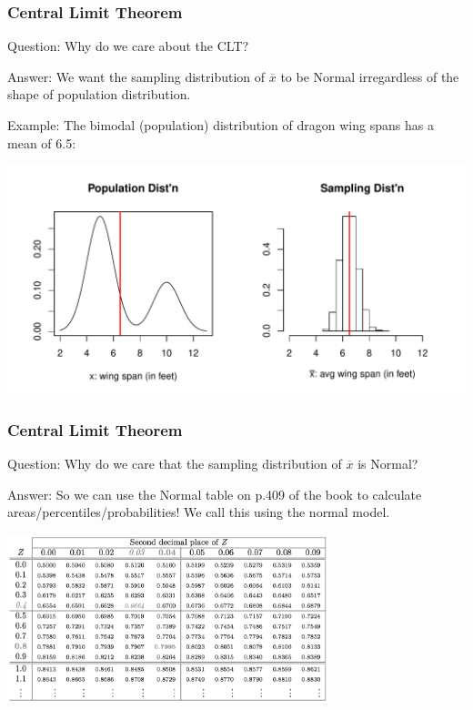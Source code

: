\documentclass[handout]{beamer}
\newcommand{\blue}[1]{\textcolor{blue2}{#1}}
\newcommand{\xbar}{\overline{x}}
\begin{document}
\begin{frame}
\frametitle{Central Limit Theorem}
\blue{Question}:  Why do we care about the CLT?

\vspace{0.25cm}

\blue{Answer}:  We want the sampling distribution of $\xbar$ to be Normal \blue{irregardless} of the shape of population distribution.

\vspace{0.25cm}

\blue{Example}:  The bimodal (population) distribution of dragon wing spans has a mean of 6.5:

\begin{center}
\includegraphics[width=\textwidth]{figure/CLT2.pdf}
\end{center}

\end{frame}


\begin{frame}
\frametitle{Central Limit Theorem}
\blue{Question}:  Why do we care that the sampling distribution of $\xbar$ is Normal?

\vspace{0.25cm}

\pause\blue{Answer}:  So we can use the Normal table on p.409 of the book to calculate areas/percentiles/probabilities!  We call this using the \blue{normal model}.

\vspace{0.25cm}

\begin{center}
\includegraphics[width=0.7\textwidth]{figure/normal_table.png}
\end{center}


\end{frame}
\end{document}
